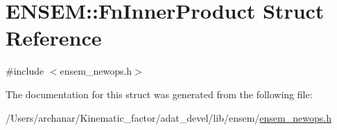 \hypertarget{structENSEM_1_1FnInnerProduct}{}\section{E\+N\+S\+EM\+:\+:Fn\+Inner\+Product Struct Reference}
\label{structENSEM_1_1FnInnerProduct}


{\ttfamily \#include $<$ensem\+\_\+newops.\+h$>$}



The documentation for this struct was generated from the following file\+:\begin{DoxyCompactItemize}
\item 
/\+Users/archanar/\+Kinematic\+\_\+factor/adat\+\_\+devel/lib/ensem/\mbox{\hyperlink{lib_2ensem_2ensem__newops_8h}{ensem\+\_\+newops.\+h}}\end{DoxyCompactItemize}
